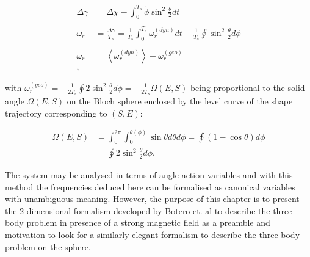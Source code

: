 \begin{align*}
\Delta \gamma &= \Delta \chi - \int_0^{T_s}\dot{\phi}\sin^2{\frac{\theta}{2}}dt\\
\\
\omega_r &= \frac{\Delta \gamma}{T_s} = \frac{1}{T_s}\int_0^{T_s}\omega_r^{(dyn)}dt -\frac{1}{T_s}\oint\sin^2{\frac{\theta}{2}}d\phi\\
\\
\omega_r &= \left\langle \omega_r^{(dyn)} \right\rangle + \omega_r^{(geo)}\\,
\end{align*}

with $\omega_r^{(geo)}= -\frac{1}{2T_s}\oint 2\sin^2{\frac{\theta}{2}}d\phi = -\frac{1}{2T_s}\Omega(E,S)$ being proportional to the solid angle $\Omega(E,S)$ on the Bloch sphere enclosed by the level curve of the shape trajectory corresponding to $(S,E)$:

\begin{align*}
\Omega(E,S) &= \int_0^{2\pi}\int_0^{\theta(\phi)} \sin{\theta}d\theta d\phi = \oint (1-\cos{\theta})d\phi\\ 
&= \oint 2\sin^2{\frac{\theta}{2}}d\phi.
\end{align*}

The system may be analysed in terms of angle-action variables and with this method the frequencies deduced here can be formalised as canonical variables with unambiguous meaning. However, the purpose of this chapter is to present the 2-dimensional formalism developed by Botero et. al to describe the three body problem in presence of a strong magnetic field as a preamble and motivation to look for a similarly elegant formalism to describe the three-body problem on the sphere.





